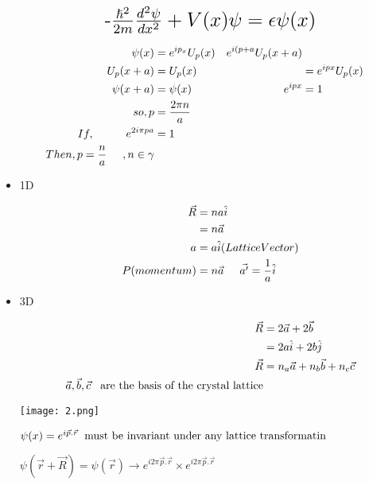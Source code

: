 \documentclass[11]{article}
\begin{document}
\begin{titlepage}
\begin{itemize}
\begin{equation*}
\large
\scalebox{1.5}{-$ \frac{\hslash^{2}}{2m} \frac{d^{2} \psi}{dx^{2}} + V(x) \psi = \epsilon \psi(x)$}
\end{equation*}

\begin{align*}
\psi (x) & = e^{i p_{x}} U_{p}(x)  &  e^{i(p+a} U_{p}(x+a)\\
U_{p}(x+a) & = U_{p}(x) &  & =e^{ipx} U_{p}(x)\\
\psi(x+a) & = \psi(x)   & e^{ipx} & =1\\
so, p & = \frac{2 \pi n}{a}\\
If, \hspace{1cm} e^{2 i \pi p a} & =1\\
Then, p=\frac{n}{a} \hspace{0.5cm} ,n \in \gamma
\end{align*}

\item 1D

\begin{align*}
\vec{R} & =na \hat{i}\\
& =n \vec{a}\\
a & =a \hat{i} (Lattice Vector)\\
P(momentum) & =n \vec{a} \hspace{0.5cm} \vec{a'} = \frac{1}{a} \hat{i}
\end{align*}

\item 3D

\begin{equation*}
\begin{split}
\vec{R} & = 2 \vec{a}+2 \vec{b}\\
& =2a \hat{i}+2b \hat{j}\\
\vec{R} & =n_{a} \vec{a}+n_{b} \vec{b}+n_{c} \vec{c}\\
\vec{a}, \vec{b}, \vec{c} \hspace{3mm} \mbox{are the basis of the crystal lattice}
\end{split}
\end{equation*}
 
 \begin{center}
 \texttt{[image: 2.png]}
 \end{center}
$\psi(x)=e^{i \vec{p} . \vec{r}} \hspace{2mm} \mbox{must be invariant under any lattice transformatin}$

$\psi(\vec{r}+ \vec{R})= \psi( \vec{r}) \rightarrow e^{i 2 \pi \vec{p}. \vec{r}} \times e^{i 2 \pi \vec{p}. \vec{r}}$\\


\end{itemize}
\end{titlepage}
\end{document}
